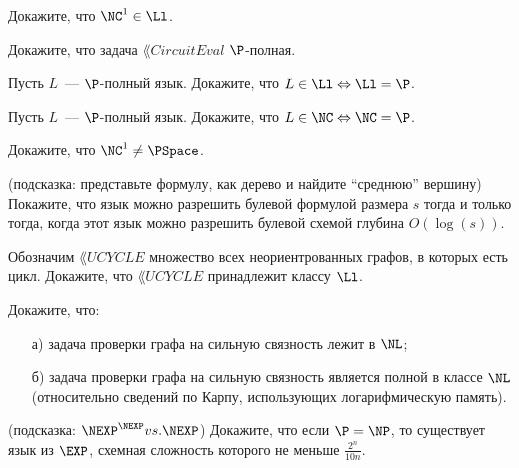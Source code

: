 
\begin{task}
    Докажите, что $\NC^1 \in \Ll$.
\end{task}

\begin{task}
    Докажите, что задача $\lang{CircuitEval}$ $\P$-полная.
\end{task}

\begin{task}
    Пусть $L$~--- $\P$-полный язык. Докажите, что $L \in \Ll \Leftrightarrow \Ll = \P$.
\end{task}

\begin{task}
    Пусть $L$~--- $\P$-полный язык. Докажите, что $L \in \NC \Leftrightarrow \NC = \P$.
\end{task}

\begin{task}
    Докажите, что $\NC^1 \neq \PSpace$.
\end{task}

\begin{task} (подсказка: представьте формулу, как дерево и найдите ``среднюю'' вершину)
    Покажите, что язык можно разрешить булевой формулой размера $s$ тогда и только тогда, когда этот язык можно разрешить булевой
    схемой глубина $O(\log(s))$.
\end{task}

\breakline

\begin{ptask}{31}
	Обозначим $\lang{UCYCLE}$ множество всех неориентрованных графов, в которых есть цикл. Докажите, что $\lang{UCYCLE}$
    принадлежит классу $\Ll$. 
\end{ptask}


\begin{ptask}{24}
    Докажите, что:
    \begin{enumerate}[topsep = 0pt, itemsep = -1ex]
        \item [а)] задача проверки графа на сильную связность лежит в $\NL$;
        \item [б)] задача проверки графа на сильную связность является полной в классе $\NL$ (относительно сведений по Карпу,
            использующих логарифмическую память).
	\end{enumerate}
\end{ptask}

\begin{ptask}{26}(подсказка: $\NEXP^{\NEXP} vs. \NEXP$)
    Докажите, что если $\P = \NP$, то существует язык из $\EXP$, схемная сложность которого не меньше $\frac{2^n}{10 n}$.
\end{ptask}

